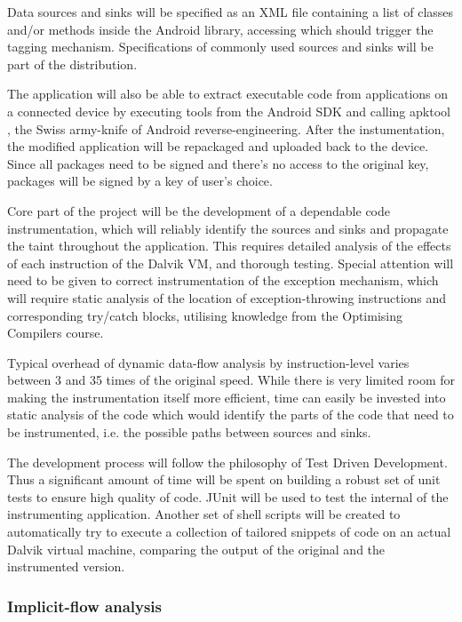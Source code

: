 \documentclass[12pt]{article}
\begin{document}
Data sources and sinks will be specified as an XML file containing a list
of classes and/or methods inside the Android library, accessing which
should trigger the tagging mechanism. Specifications of commonly used 
sources and sinks will be part of the distribution.

The application will also be able to extract executable code from 
applications on a connected device by executing tools from the Android SDK
and calling apktool \cite{code.google.com/p/android-apktool}, the Swiss 
army-knife of Android reverse-engineering. After the instumentation, 
the modified application will be repackaged and uploaded back to the device. 
Since all packages need to be signed and there's no access to the original key, 
packages will be signed by a key of user's choice.

Core part of the project will be the development of a dependable code 
instrumentation, which will reliably identify the sources and sinks and
propagate the taint throughout the application. This requires detailed
analysis of the effects of each instruction of the Dalvik VM, and 
thorough testing. Special attention will need to be given to correct 
instrumentation of the exception mechanism, which will require static 
analysis of the location of exception-throwing instructions and 
corresponding try/catch blocks, utilising knowledge from the Optimising
Compilers course.

Typical overhead of dynamic data-flow analysis by instruction-level 
varies between 3 and 35 times of the original speed. While there is
very limited room for making the instrumentation itself more efficient,
time can easily be invested into static analysis of the code which would
identify the parts of the code that need to be instrumented, i.e. the 
possible paths between sources and sinks. 

The development process will follow the philosophy of Test Driven 
Development. Thus a significant amount of time will be spent on building 
a robust set of unit tests to ensure high quality of code. JUnit will be 
used to test the internal of the instrumenting application. Another set of 
shell scripts will be created to automatically try to execute a collection
of tailored snippets of code on an actual Dalvik virtual machine, 
comparing the output of the original and the instrumented version.

\subsubsection*{Implicit-flow analysis}
\end{document}
